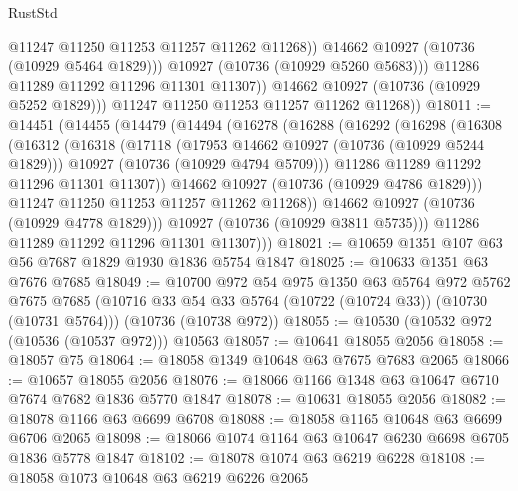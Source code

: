 \begin{lexlean}{RustStd}
\begin{coremodule}
                      @11247
                      @11250
                      @11253
                      @11257
                      @11262
                      @11268))
                  @14662
                  @10927
                  (@10736 (@10929 @5464 @1829)))
                @10927
                (@10736 (@10929 @5260 @5683)))
              @11286
              @11289
              @11292
              @11296
              @11301
              @11307))
          @14662
          @10927
          (@10736 (@10929 @5252 @1829)))
        @11247
        @11250
        @11253
        @11257
        @11262
        @11268))
@18011 := @14451
    (@14455
      (@14479
        (@14494
          (@16278
            (@16288
              (@16292
                (@16298
                  (@16308
                    (@16312
                      (@16318
                        (@17118
                          (@17953 @14662 @10927 (@10736 (@10929 @5244 @1829)))
                          @10927
                          (@10736 (@10929 @4794 @5709)))
                        @11286
                        @11289
                        @11292
                        @11296
                        @11301
                        @11307))
                    @14662
                    @10927
                    (@10736 (@10929 @4786 @1829)))
                  @11247
                  @11250
                  @11253
                  @11257
                  @11262
                  @11268))
              @14662
              @10927
              (@10736 (@10929 @4778 @1829)))
            @10927
            (@10736 (@10929 @3811 @5735)))
          @11286
          @11289
          @11292
          @11296
          @11301
          @11307)))
@18021 := @10659 @1351 @107 @63 @56 @7687 @1829 @1930 @1836 @5754 @1847
@18025 := @10633 @1351 @63 @7676 @7685
@18049 := @10700
    @972
    @54
    @975
    @1350
    @63
    @5764
    @972
    @5762
    @7675
    @7685
    (@10716 @33 @54 @33 @5764 (@10722 (@10724 @33)) (@10730 (@10731 @5764)))
    (@10736 (@10738 @972))
@18055 := @10530 (@10532 @972 (@10536 (@10537 @972))) @10563
@18057 := @10641 @18055 @2056
@18058 := @18057 @75
@18064 := @18058 @1349 @10648 @63 @7675 @7683 @2065
@18066 := @10657 @18055 @2056
@18076 := @18066 @1166 @1348 @63 @10647 @6710 @7674 @7682 @1836 @5770 @1847
@18078 := @10631 @18055 @2056
@18082 := @18078 @1166 @63 @6699 @6708
@18088 := @18058 @1165 @10648 @63 @6699 @6706 @2065
@18098 := @18066 @1074 @1164 @63 @10647 @6230 @6698 @6705 @1836 @5778 @1847
@18102 := @18078 @1074 @63 @6219 @6228
@18108 := @18058 @1073 @10648 @63 @6219 @6226 @2065

\end{coremodule}
\end{lexlean}
